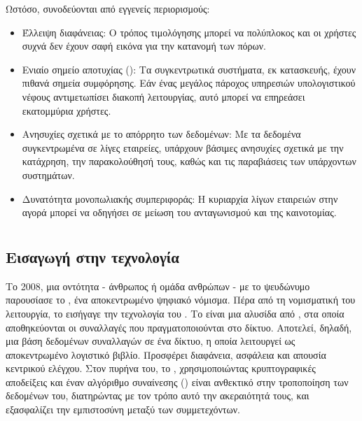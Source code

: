 Ωστόσο, συνοδεύονται από εγγενείς περιορισμούς:
\begin{itemize}
\item Έλλειψη διαφάνειας: Ο τρόπος τιμολόγησης μπορεί να πολύπλοκος και οι 
χρήστες συχνά δεν έχουν σαφή εικόνα για την κατανομή των πόρων.
\item Ενιαίο σημείο αποτυχίας (): Τα συγκεντρωτικά 
συστήματα, εκ κατασκευής, έχουν πιθανά σημεία συμφόρησης. Εάν ένας μεγάλος 
πάροχος υπηρεσιών υπολογιστικού νέφους αντιμετωπίσει διακοπή λειτουργίας, 
αυτό μπορεί να επηρεάσει εκατομμύρια χρήστες.
\item Ανησυχίες σχετικά με το απόρρητο των δεδομένων: Με τα δεδομένα 
συγκεντρωμένα σε λίγες εταιρείες, υπάρχουν βάσιμες ανησυχίες σχετικά με την 
κατάχρηση, την παρακολούθησή τους, καθώς και τις παραβιάσεις των υπάρχοντων 
συστημάτων.
\item Δυνατότητα μονοπωλιακής συμπεριφοράς: Η κυριαρχία λίγων εταιρειών στην 
αγορά μπορεί να οδηγήσει σε μείωση του ανταγωνισμού και της καινοτομίας.
\end{itemize}

\section{}
\subsection{Εισαγωγή στην τεχνολογία }
Το 2008, μια οντότητα - άνθρωπος ή ομάδα ανθρώπων - με το ψευδώνυμο  παρουσίασε το , ένα αποκεντρωμένο ψηφιακό νόμισμα. Πέρα από τη νομισματική του λειτουργία, το  εισήγαγε την τεχνολογία του . 
Το  είναι μια αλυσίδα από , στα οποία αποθηκεύονται οι συναλλαγές που πραγματοποιούνται στο δίκτυο. Αποτελεί, δηλαδή, μια βάση δεδομένων συναλλαγών σε ένα δίκτυο, η οποία λειτουργεί ως αποκεντρωμένο λογιστικό βιβλίο. Προσφέρει διαφάνεια, ασφάλεια και απουσία κεντρικού ελέγχου. Στον πυρήνα του, το , χρησιμοποιώντας κρυπτογραφικές αποδείξεις και έναν αλγόριθμο συναίνεσης () είναι ανθεκτικό στην τροποποίηση των δεδομένων του, διατηρώντας με τον τρόπο αυτό την ακεραιότητά τους, και εξασφαλίζει την εμπιστοσύνη μεταξύ των συμμετεχόντων.

